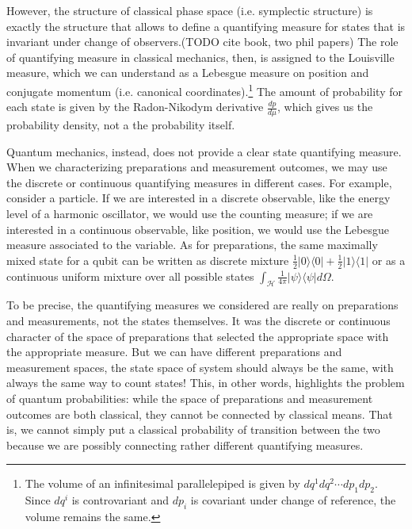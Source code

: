 \documentclass[10pt,twocolumn, nofootinbib]{revtex4-2}
\def\>{\rangle}
\def\<{\langle}
\begin{document}
However, the structure of classical phase space (i.e. symplectic structure) is exactly the structure that allows to define a quantifying measure for states that is invariant under change of observers.(TODO cite book, two phil papers) The role of quantifying measure in classical mechanics, then, is assigned to the Louisville measure, which we can understand as a Lebesgue measure on position and conjugate momentum (i.e. canonical coordinates).\footnote{The volume of an infinitesimal parallelepiped is given by $dq^1 dq^2 \cdots dp_1 dp_2$. Since $dq^i$ is controvariant and $dp_i$ is covariant under change of reference, the volume remains the same.} The amount of probability for each state is given by the Radon-Nikodym derivative $\frac{dp}{d\mu}$, which gives us the probability density, not a the probability itself.


Quantum mechanics, instead, does not provide a clear state quantifying measure. When we characterizing preparations and measurement outcomes, we may use the discrete or continuous quantifying measures in different cases. For example, consider a particle. If we are interested in a discrete observable, like the energy level of a harmonic oscillator, we would use the counting measure; if we are interested in a continuous observable, like position, we would use the Lebesgue measure associated to the variable. As for preparations, the same maximally mixed state for a qubit can be written as discrete mixture $\frac{1}{2} | 0 \> \< 0 | + \frac{1}{2} | 1 \> \< 1 | $ or as a continuous uniform mixture over all possible states $\int_\mathcal{H} \frac{1}{4\pi} | \psi \> \< \psi | d\Omega$.

To be precise, the quantifying measures we considered are really on preparations and measurements, not the states themselves. It was the discrete or continuous character of the space of preparations that selected the appropriate space with the appropriate measure. But we can have different preparations and measurement spaces, the state space of system should always be the same, with always the same way to count states! This, in other words, highlights the problem of quantum probabilities: while the space of preparations and measurement outcomes are both classical, they cannot be connected by classical means. That is, we cannot simply put a classical probability of transition between the two because we are possibly connecting rather different quantifying measures.
\end{document}
